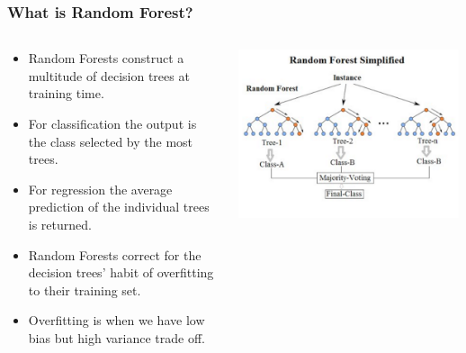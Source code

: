 \documentclass{beamer}
\begin{document}
			\begin{frame}
		\frametitle{ What is Random Forest? }
								\begin{columns}
			\begin{footnotesize}
				\begin{itemize}
					\item Random Forests construct a multitude of decision trees at training time.
					\item For classification the output is the class selected by the most trees.
					\item For regression the average prediction of the individual trees is returned.
					\item Random Forests correct for the decision trees' habit of overfitting to their training set.
					\item Overfitting is when we have low bias but high variance trade off.
				\end{itemize}
				 
			\end{footnotesize}
			\includegraphics[width=1.\textwidth]{images/random_forest_diagram.png}
			
		\end{columns}
	\end{frame}
\end{document}
